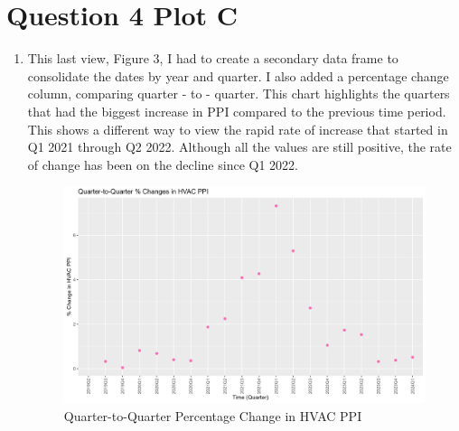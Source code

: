 \documentclass{article}
\begin{document}
\section{Question 4 Plot C}
\begin{enumerate}
\item This last view, Figure 3, I had to create a secondary data frame to consolidate the dates by year and quarter. I also added a percentage change column, comparing quarter - to - quarter. This chart highlights the quarters that had the biggest increase in PPI compared to the previous time period. This shows a different way to view the rapid rate of increase that started in Q1 2021 through Q2 2022. Although all the values are still positive, the rate of change has been on the decline since Q1 2022.
    \begin{figure}
        \centering
        \includegraphics[width=1\linewidth]{PS6c_Smith.png}
        \caption{Quarter-to-Quarter Percentage Change in HVAC PPI}
        \label{fig:enter-label}
    \end{figure}
\end{enumerate}
\end{document}
